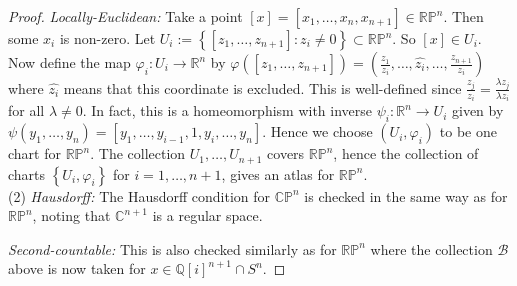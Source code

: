 \documentclass[reqno]{amsart}
\theoremstyle{definition}
\theoremstyle{remark}
\begin{document}
\begin{proof}
    \textit{Locally-Euclidean:} Take
    a point $
    \left[ x \right] =\left[ x_1,\ldots,x_n, x_{n+1} \right]
    \in \mathbb{R}\mathbb{P}^{n}$. Then
    some $x_i$ is non-zero. Let
    $U_i := \left\{ 
    \left[ z_1, \ldots, z_{n+1} \right] \colon
z_i \neq 0 \right\} \subset \mathbb{R}\mathbb{P}^{n}$.
So $\left[ x \right] \in U_i$. Now define the map
$\varphi_i \colon U_i \to \mathbb{R}^{n}$ by
$\varphi \left( \left[ z_1, \ldots, z_{n+1} \right]  \right) 
= \left( \frac{z_1}{z_i}, \ldots,
    \hat{z_i}, \ldots,
\frac{z_{n+1}}{z_i}\right) $ where
$\hat{z_i}$ means that this coordinate is excluded.
This is well-defined since $\frac{z_j}{z_i}=
\frac{\lambda z_j}{\lambda z_i}$ for all
$\lambda \neq 0$. In fact, this is a 
homeomorphism with inverse
$\psi_{i} \colon \mathbb{R}^{n}\to U_i$ given by
$\psi \left( y_1, \ldots, y_n \right) 
= \left[y_1, \ldots, y_{i-1}, 1, y_{i},\ldots,
y_n \right] $. Hence we choose
$\left( U_i, \varphi_i \right) $ to be one
chart for $\mathbb{R}\mathbb{P}^{n}$. The collection
$U_1, \ldots, U_{n+1}$ covers $\mathbb{R}\mathbb{P}^{n}$, hence
the collection of charts
$\left\{ U_i, \varphi_i \right\} $ for
$i = 1,\ldots, n+1$, gives an atlas for
$\mathbb{R}\mathbb{P}^{n}$.\\
\linebreak
(2) \textit{Hausdorff:} The Hausdorff condition
 for $\mathbb{C}\mathbb{P}^{n}$ is checked
 in the same way as for $\mathbb{R}\mathbb{P}^{n}$, noting
 that $\mathbb{C}^{n+1}$ is a regular space.

 \textit{Second-countable:} 
This is also checked similarly as for
$\mathbb{R}\mathbb{P}^{n}$ where
the collection $\mathcal{B}$ above is now taken
for $x \in \mathbb{Q}[i]^{n+1}\cap S^{n}$.


\end{proof}
\end{document}
